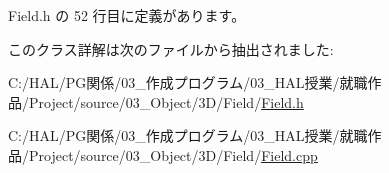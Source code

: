  Field.\+h の 52 行目に定義があります。



このクラス詳解は次のファイルから抽出されました\+:\begin{DoxyCompactItemize}
\item 
C\+:/\+H\+A\+L/\+P\+G関係/03\+\_\+作成プログラム/03\+\_\+\+H\+A\+L授業/就職作品/\+Project/source/03\+\_\+\+Object/3\+D/\+Field/\mbox{\hyperlink{_field_8h}{Field.\+h}}\item 
C\+:/\+H\+A\+L/\+P\+G関係/03\+\_\+作成プログラム/03\+\_\+\+H\+A\+L授業/就職作品/\+Project/source/03\+\_\+\+Object/3\+D/\+Field/\mbox{\hyperlink{_field_8cpp}{Field.\+cpp}}\end{DoxyCompactItemize}
